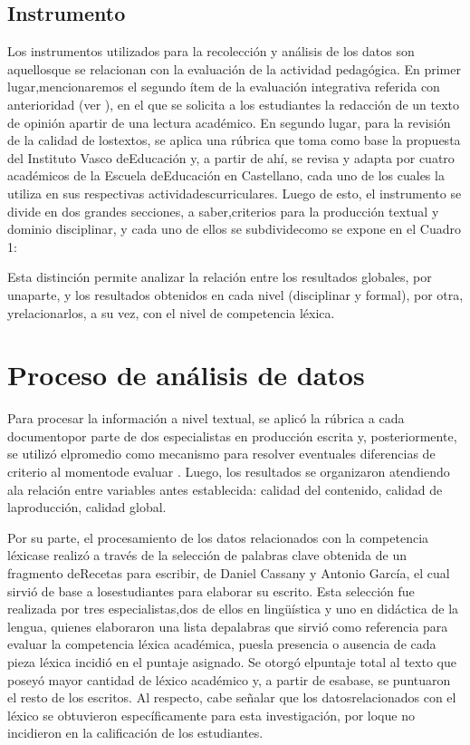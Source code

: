 \documentclass{textolivre}
\begin{document}
\subsection{Instrumento}\label{sec-instru}
Los instrumentos utilizados para la recolección y análisis de los datos son
aquellosque se relacionan con la evaluación de la actividad pedagógica. En
primer lugar,mencionaremos el segundo ítem de la evaluación integrativa
referida con anterioridad (ver ), en el que se solicita a los estudiantes la
redacción de un texto de opinión apartir de una lectura académico. En segundo
lugar, para la revisión de la calidad de lostextos, se aplica una rúbrica que
toma como base la propuesta del Instituto Vasco deEducación \cite{ivei2013}
y, a partir de ahí, se revisa y
adapta por cuatro académicos de la Escuela deEducación en Castellano, cada uno
de los cuales la utiliza en sus respectivas actividadescurriculares. Luego de
esto, el instrumento se divide en dos grandes secciones, a saber,criterios para
la producción textual y dominio disciplinar, y cada uno de ellos se
subdividecomo se expone en el Cuadro 1:


Esta distinción permite analizar la relación entre los resultados globales, por
unaparte, y los resultados obtenidos en cada nivel (disciplinar y formal), por
otra, yrelacionarlos, a su vez, con el nivel de competencia léxica.



\section{Proceso de análisis de datos}\label{sec-proc-ana}
Para procesar la información a nivel textual, se aplicó la rúbrica a cada
documentopor parte de dos especialistas en producción escrita y,
posteriormente, se utilizó elpromedio como mecanismo para resolver eventuales
diferencias de criterio al momentode evaluar \cite[p. 99]{gamboa2010}. Luego,
los resultados se organizaron atendiendo ala relación entre variables antes
establecida: calidad del contenido, calidad de laproducción, calidad global.

Por su parte, el procesamiento de los datos relacionados con la competencia
léxicase realizó a través de la selección de palabras clave obtenida de un
fragmento deRecetas para escribir, de Daniel Cassany y Antonio García, el cual
sirvió de base a losestudiantes para elaborar su escrito. Esta selección fue
realizada por tres especialistas,dos de ellos en lingüística y uno en didáctica
de la lengua, quienes elaboraron una lista depalabras que sirvió como
referencia para evaluar la competencia léxica académica, puesla presencia o
ausencia de cada pieza léxica incidió en el puntaje asignado. Se otorgó
elpuntaje total al texto que poseyó mayor cantidad de léxico académico y, a
partir de esabase, se puntuaron el resto de los escritos. Al respecto, cabe
señalar que los datosrelacionados con el léxico se obtuvieron específicamente
para esta investigación, por loque no incidieron en la calificación de los
estudiantes.
\end{document}
